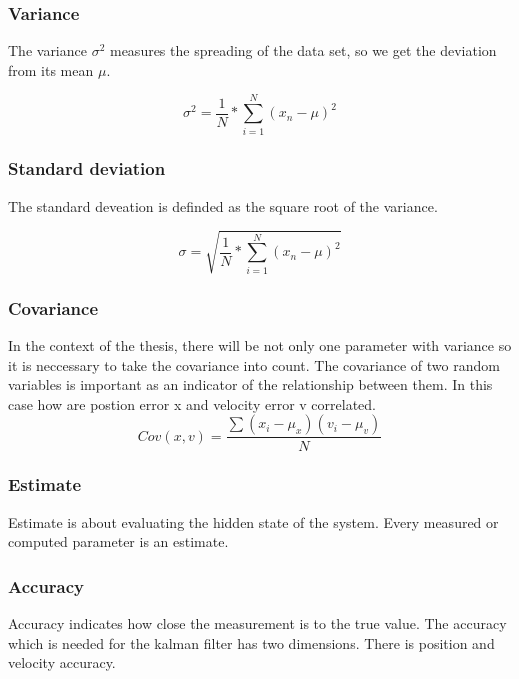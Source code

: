 \subsubsection{Variance}
The variance $\sigma^{2}$ measures the spreading of the data set, so we get the deviation from its mean $\mu$.

\begin{equation}
\sigma^{2} = 
\frac{1}{N} * 
\sum_{i=1}^{N} (x_{n} - \mu)^{2}
\label{variance}
\end{equation}



\subsubsection{Standard deviation}
The standard deveation is definded as the square root of the variance.

\begin{equation}
\sigma = 
	\sqrt{
	\frac{1}{N} * 
		\sum_{i=1}^{N} (x_{n} - \mu)^{2}
	}
	\label{standard deviation}
\end{equation}

\subsubsection{Covariance}
In the context of the thesis, there will be not only one parameter with variance so it is neccessary to take the covariance into count. The covariance of two random variables is important as an indicator of the relationship between them. In this case how are postion error x and velocity error v correlated.
\begin{equation}
Cov(x,v) = 
\frac{
\sum (x_{i} - \mu _{x})  (v_{i} - \mu _{v})
}
{N} 
\label{covariance}
\end{equation}

\subsubsection{Estimate}
Estimate is about evaluating the hidden state of the system. Every measured or computed parameter is an estimate.
 
\subsubsection{Accuracy}
Accuracy indicates how close the measurement is to the true value. The accuracy which is needed for the kalman filter has two dimensions. There is position and velocity accuracy.

